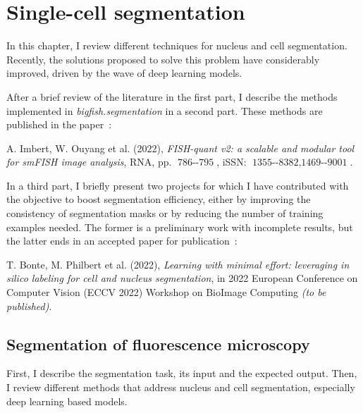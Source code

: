 
\graphicspath{{./figures/chapter3/}}

\chapter{Single-cell segmentation}
\label{ch:chapter3}

\minitoc
\newpage

In this chapter, I review different techniques for nucleus and cell segmentation.
Recently, the solutions proposed to solve this problem have considerably improved, driven by the wave of deep learning models.

After a brief review of the literature in the first part, I describe the methods implemented in \emph{bigfish.segmentation} in a second part.
These methods are published in the paper~\cite{Imbert_fq_2022}:

\begin{center}
	\color{green}
	A. Imbert, W. Ouyang et al. (2022), \textit{FISH-quant v2: a scalable and modular tool for smFISH image analysis}, RNA, pp. $\operatorname{786--795}$, iSSN: $\operatorname{1355--8382, 1469--9001}$.
\end{center}

In a third part, I briefly present two projects for which I have contributed with the objective to boost segmentation efficiency, either by improving the consistency of segmentation masks or by reducing the number of training examples needed.
The former is a preliminary work with incomplete results, but the latter ends in an accepted paper for publication~\cite{Bonte_2022}:

\begin{center}
	\color{green}
	T. Bonte, M. Philbert et al. (2022), \textit{Learning with minimal effort: leveraging in silico labeling for cell and nucleus segmentation}, in 2022 European Conference on Computer Vision (ECCV 2022) Workshop on BioImage Computing \textit{(to be published)}.
\end{center}

\section{Segmentation of fluorescence microscopy}
\label{sec:segmentation_introduction}

First, I describe the segmentation task, its input and the expected output.
Then, I review different methods that address nucleus and cell segmentation, especially deep learning based models.

